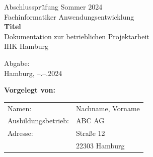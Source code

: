 \documentclass[12pt, ngerman, a4paper,toc=left, parskip=half, numbers=noenddot, headings=standardclasses, nonumberlist]{scrartcl}
\begin{document}
\hypersetup{pageanchor=false}
\thispagestyle{empty}

\vspace{1cm}
\begin{center}
	\vspace{3cm}
	{\large Abschlussprüfung Sommer 2024} \\
	\vspace{2cm}
	{\large Fachinformatiker Anwendungsentwicklung} \\
	\vspace{3cm}
	{\huge \textbf{Titel}}\\
	\vspace{1.5cm}
	{\large Dokumentation zur betrieblichen Projektarbeit}\\
	\vspace{1.5pt}
	{\large IHK Hamburg }
\end{center}

\vspace{1cm}
\begin{flushleft}
	Abgabe: \\
	Hamburg, --.--.2024 
	
	\vspace{1cm}
	
	\textbf{Vorgelegt von:} \\
	\begin{tabular}{l l}
		Namen:       		& Nachname, Vorname \\
		Ausbildungsbetrieb: & ABC AG			\\
		Adresse:		    & Straße 12			\\
							& 22303 Hamburg		\\
	\end{tabular}
\end{flushleft}

\newpage
\hypersetup{pageanchor=true}
\renewcommand{\thepage}{\Roman{page}}
\tableofcontents{}

\newpage
\cleardoublepage{}
{}
\listoffigures
\renewcommand{\figurename}{Abb.}

\newpage
\cleardoublepage{}
\printnoidxglossary[type=\acronymtype, title= Abkürzungsverzeichnis]

\newpage
\cleardoublepage{}
\printnoidxglossary[title= Glossar]
\end{document}
